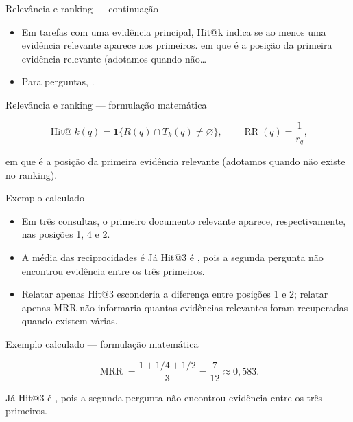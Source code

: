 \documentclass[10pt,aspectratio=169]{beamer}
\begin{document}
\begin{frame}[t]{Relevância e ranking — continuação}
\small
\begin{itemize}
\item Em tarefas com uma evidência principal, Hit@k indica se ao menos uma evidência relevante aparece nos primeiros. em que é a posição da primeira evidência relevante (adotamos quando não…
\item Para perguntas, .
\end{itemize}
\end{frame}

\begin{frame}[t]{Relevância e ranking — formulação matemática}
\small
\vspace{3mm}\begin{center}\small\[\operatorname{Hit@}k(q)=\mathbf1\{R(q)\cap T_k(q)\ne\varnothing\},\qquad
\operatorname{RR}(q)=\frac1{r_q},\]\end{center}
\vspace{3mm}\small em que é a posição da primeira evidência relevante (adotamos quando não existe no ranking).
\end{frame}

\begin{frame}[t]{Exemplo calculado}
\small
\begin{itemize}
\item Em três consultas, o primeiro documento relevante aparece, respectivamente, nas posições 1, 4 e 2.
\item A média das reciprocidades é Já Hit@3 é , pois a segunda pergunta não encontrou evidência entre os três primeiros.
\item Relatar apenas Hit@3 esconderia a diferença entre posições 1 e 2; relatar apenas MRR não informaria quantas evidências relevantes foram recuperadas quando existem várias.
\end{itemize}
\end{frame}

\begin{frame}[t]{Exemplo calculado — formulação matemática}
\small
\vspace{3mm}\begin{center}\small\[\operatorname{MRR}=\frac{1+1/4+1/2}{3}=\frac{7}{12}\approx0{,}583.\]\end{center}
\vspace{3mm}\small Já Hit@3 é , pois a segunda pergunta não encontrou evidência entre os três primeiros.
\end{frame}
\end{document}
